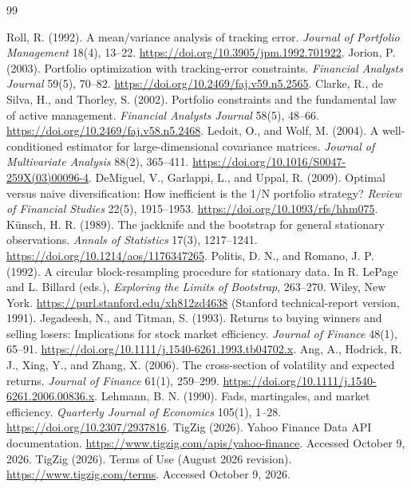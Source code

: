 \documentclass[11pt,a4paper]{article}
\begin{document}
\clearpage
\begin{thebibliography}{99}
\raggedright
{} Roll, R. (1992). A mean/variance analysis of tracking error.
\emph{Journal of Portfolio Management} 18(4), 13--22.
\url{https://doi.org/10.3905/jpm.1992.701922}.
 Jorion, P. (2003). Portfolio optimization with tracking-error
constraints. \emph{Financial Analysts Journal} 59(5), 70--82.
\url{https://doi.org/10.2469/faj.v59.n5.2565}.
 Clarke, R., de Silva, H., and Thorley, S. (2002). Portfolio
constraints and the fundamental law of active management.
\emph{Financial Analysts Journal} 58(5), 48--66.
\url{https://doi.org/10.2469/faj.v58.n5.2468}.
 Ledoit, O., and Wolf, M. (2004). A well-conditioned estimator for
large-dimensional covariance matrices. \emph{Journal of Multivariate Analysis}
88(2), 365--411. \url{https://doi.org/10.1016/S0047-259X(03)00096-4}.
 DeMiguel, V., Garlappi, L., and Uppal, R. (2009). Optimal versus
naive diversification: How inefficient is the 1/N portfolio strategy?
\emph{Review of Financial Studies} 22(5), 1915--1953.
\url{https://doi.org/10.1093/rfs/hhm075}.
 K\"unsch, H. R. (1989). The jackknife and the bootstrap for
general stationary observations. \emph{Annals of Statistics} 17(3), 1217--1241.
\url{https://doi.org/10.1214/aos/1176347265}.
 Politis, D. N., and Romano, J. P. (1992).
A circular block-resampling procedure for stationary data.
In R. LePage and L. Billard (eds.), \emph{Exploring the Limits of Bootstrap},
263--270. Wiley, New York.
\url{https://purl.stanford.edu/xh812zd4638}
(Stanford technical-report version, 1991).
 Jegadeesh, N., and Titman, S. (1993). Returns to buying winners
and selling losers: Implications for stock market efficiency.
\emph{Journal of Finance} 48(1), 65--91.
\url{https://doi.org/10.1111/j.1540-6261.1993.tb04702.x}.
 Ang, A., Hodrick, R. J., Xing, Y., and Zhang, X. (2006).
The cross-section of volatility and expected returns.
\emph{Journal of Finance} 61(1), 259--299.
\url{https://doi.org/10.1111/j.1540-6261.2006.00836.x}.
 Lehmann, B. N. (1990). Fads, martingales, and market efficiency.
\emph{Quarterly Journal of Economics} 105(1), 1--28.
\url{https://doi.org/10.2307/2937816}.
 TigZig (2026). Yahoo Finance Data API documentation.
\url{https://www.tigzig.com/apis/yahoo-finance}. Accessed October 9, 2026.
 TigZig (2026). Terms of Use (August 2026 revision).
\url{https://www.tigzig.com/terms}. Accessed October 9, 2026.
\end{thebibliography}
\clearpage\appendix
\end{document}
